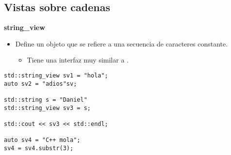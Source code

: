 \subsection{Vistas sobre cadenas}

\begin{frame}[t,fragile]{\textbf{string\_view}}
\begin{itemize}
  \item Define un objeto que se refiere a una secuencia de caracteres
        constante.
    \begin{itemize}
      \item Tiene una interfaz muy similar a .
    \end{itemize}
\end{itemize}
\begin{lstlisting}
std::string_view sv1 = "hola";
auto sv2 = "adios"sv;

std::string s = "Daniel"
std::string_view sv3 = s;

std::cout << sv3 << std::endl;

auto sv4 = "C++ mola";
sv4 = sv4.substr(3);
\end{lstlisting}
\end{frame}
